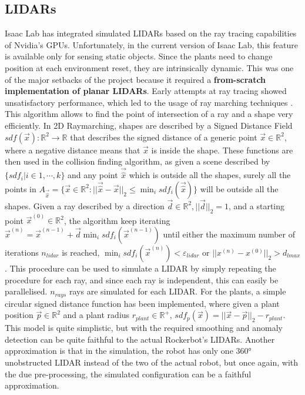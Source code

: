 \documentclass[11pt,a4paper,twocolumn]{article}
\begin{document}
\subsection{LIDARs}
Isaac Lab has integrated simulated LIDARs based on the ray tracing capabilities of Nvidia's GPUs. Unfortunately, in the current version 
of Isaac Lab, this feature is available only for sensing static objects. Since the plants need to change position at each environment reset, they are intrinsically dynamic. This was one of the major setbacks of the project because it required a \textbf{from-scratch implementation of planar LIDARs}. Early attempts at ray tracing showed unsatisfactory performance, which led to the usage of ray marching techniques \cite{Raymarching}. This algorithm allows to find the point of intersection of a ray and a shape very efficiently.  In 2D Raymarching, shapes are described by a Signed Distance Field $sdf(\vec{x}):\mathbb{R}^2\to\mathbb{R}$ that describes the signed distance of a generic point $\vec{x} \in \mathbb{R}^2$, where a negative distance means that $\vec{x}$ is inside the shape. These functions are then used in the collision finding algorithm, as given a scene described by $\{sdf_i|i\in{1, \cdots, k}\}$ and any point $\vec{\hat{x}}$ which is outside all the shapes, surely all the points in $A_{\vec{\hat{x}}} = \{\vec{x}\in\mathbb{R}^2: ||\vec{\hat{x}}-\vec{x}||_2 \leq \min_{i}sdf_i(\vec{\hat{x}}) \}$ will be outside all the shapes. Given a ray described by a direction $\vec{d}\in\mathbb{R}^2, ||\vec{d}||_2 = 1$, and a starting point $\vec{x}^{(0)} \in \mathbb{R}^2$, the algorithm keep iterating $\vec{x}^{(n)} = \vec{x}^{(n-1)} + \vec{d} \min_{i}sdf_i(\vec{x}^{(n-1)})$ until either the maximum number of iterations $n_{lidar}$ is reached,  $\min_{i}sdf_i(\vec{x}^{(n)})<\varepsilon_{lidar}$ or $||x^{(n)} - x^{(0)}||_2 > d_{lmax}$. This procedure can be used to simulate a LIDAR by simply repeating the procedure for each ray, and since each ray is independent, this can easily be parallelised. $n_{rays}$ rays are simulated for each LIDAR. For the plants, a simple circular signed distance function has been implemented, where given a plant position $\vec{p} \in \mathbb{R}^2$ and a plant radius $r_{plant} \in \mathbb{R}^+$, $sdf_p(\vec{x})=||\vec{x} - \vec{p} ||_2 - r_{plant}$. This model is quite simplistic, but with the required smoothing and anomaly detection can be quite faithful to the actual Rockerbot's LIDARs. Another approximation is that in the simulation, the robot has only one 360° unobstructed LIDAR instead of the two of the actual robot, but once again, with the due pre-processing, the simulated configuration can be a faithful approximation.
\end{document}
